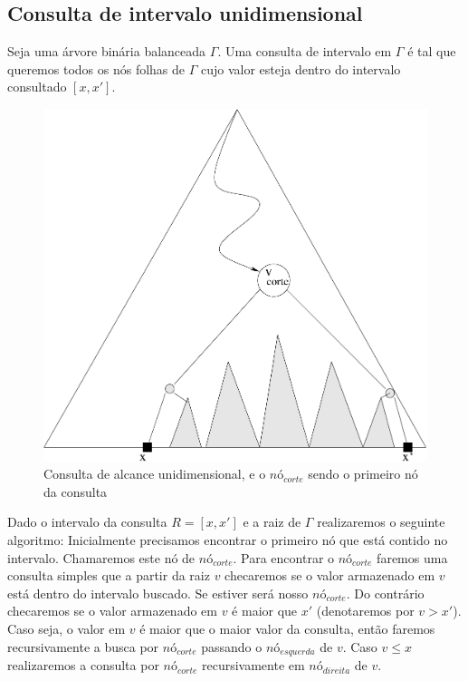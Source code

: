 \subsection{Consulta de intervalo unidimensional}

Seja uma árvore binária balanceada $\Gamma$. Uma consulta de intervalo em $\Gamma$ é tal que queremos
todos os nós folhas de $\Gamma$ cujo valor esteja dentro do intervalo consultado $[x, x']$.

\begin{figure}[h]
    \begin{center}
        \includegraphics[scale=0.4]{images/range_tree2.pdf}
    \end{center}
    \caption{Consulta de alcance unidimensional, e o $nó_{corte}$ sendo o primeiro nó da consulta}
\end{figure}


Dado o intervalo da consulta $R = [x , x']$ e a raiz de $\Gamma$ realizaremos o seguinte algoritmo:
Inicialmente precisamos encontrar o primeiro nó que está contido no intervalo. Chamaremos este nó de $nó_{corte}$.
Para encontrar o $nó_{corte}$ faremos uma consulta simples que a partir da raiz $v$ checaremos se o valor armazenado em $v$
está dentro do intervalo buscado. Se estiver será nosso $nó_{corte}$. Do contrário checaremos se o valor armazenado em $v$ é maior que $x'$ (denotaremos por $v > x'$). Caso seja, o valor em $v$ é maior que o maior valor da consulta, então faremos recursivamente a busca por $nó_{corte}$
passando o $nó_{esquerda}$ de $v$. Caso $v \leq x$ realizaremos a consulta por $nó_{corte}$ recursivamente
em $nó_{direita}$ de $v$.


